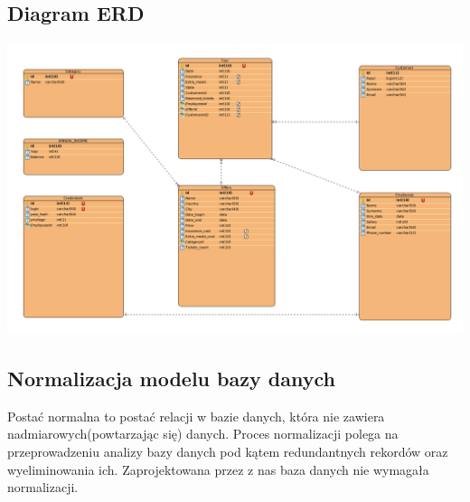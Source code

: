 \documentclass[polish,polish,a4paper]{article}
\begin{document}
\subsection{Diagram ERD}
\includegraphics[width=18cm]{ERD_diagram.png}
\subsection{Normalizacja modelu bazy danych}
Postać normalna to postać relacji w bazie danych, która nie zawiera nadmiarowych(powtarzając się) danych. Proces normalizacji polega na przeprowadzeniu analizy bazy danych pod kątem redundantnych rekordów oraz wyeliminowania ich. Zaprojektowana przez z nas baza danych nie wymagała normalizacji. 
\end{document}
